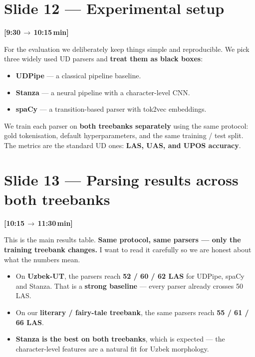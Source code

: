 \documentclass[12pt,a4paper]{article}
\newcommand{\timing}[2]{%
   \par\noindent\textbf{\small [#1\,$\to$\,#2\,min]}\par\vspace{0.2em}}
\newcommand{\say}[1]{\textbf{#1}}
\begin{document}
\section*{Slide 12 — Experimental setup}
\timing{9:30}{10:15}

For the evaluation we deliberately keep things simple and reproducible.
We pick three widely used UD parsers and \textbf{treat them as black boxes}:

\begin{itemize}
   \item \textbf{UDPipe} — a classical pipeline baseline.
   \item \textbf{Stanza} — a neural pipeline with a character-level CNN.
   \item \textbf{spaCy} — a transition-based parser with tok2vec embeddings.
\end{itemize}

\noindent
We train each parser on \textbf{both treebanks separately} using the same
protocol: gold tokenisation, default hyperparameters, and the same
training / test split. The metrics are the standard UD ones:
\textbf{LAS, UAS, and UPOS accuracy}.

\section*{Slide 13 — Parsing results across both treebanks}
\timing{10:15}{11:30}

This is the main results table. \say{Same protocol, same parsers — only the
training treebank changes.} I want to read it carefully so we are honest
about what the numbers mean.

\begin{itemize}
   \item On \textbf{Uzbek-UT}, the parsers reach \textbf{52 / 60 / 62 LAS} for UDPipe, spaCy and Stanza. That is a \textbf{strong baseline} — every parser already crosses 50 LAS.
   \item On our \textbf{literary / fairy-tale treebank}, the same parsers reach \textbf{55 / 61 / 66 LAS}.
   \item \textbf{Stanza is the best on both treebanks}, which is expected — the character-level features are a natural fit for Uzbek morphology.
\end{itemize}
\end{document}
